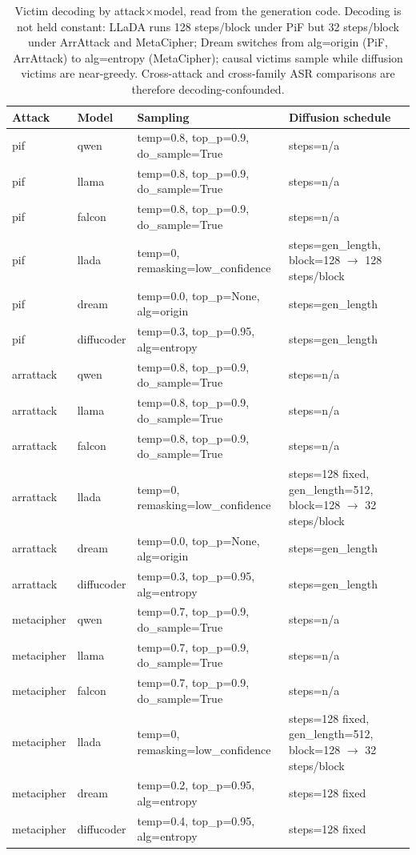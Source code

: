 \begin{table}[t]
\centering
\small
\begin{tabular}{llll}
\toprule
Attack & Model & Sampling & Diffusion schedule \\
\midrule
pif & qwen & temp=0.8, top\_p=0.9, do\_sample=True & steps=n/a \\
pif & llama & temp=0.8, top\_p=0.9, do\_sample=True & steps=n/a \\
pif & falcon & temp=0.8, top\_p=0.9, do\_sample=True & steps=n/a \\
pif & llada & temp=0, remasking=low\_confidence & steps=gen\_length, block=128 $\to$ 128 steps/block \\
pif & dream & temp=0.0, top\_p=None, alg=origin & steps=gen\_length \\
pif & diffucoder & temp=0.3, top\_p=0.95, alg=entropy & steps=gen\_length \\
arrattack & qwen & temp=0.8, top\_p=0.9, do\_sample=True & steps=n/a \\
arrattack & llama & temp=0.8, top\_p=0.9, do\_sample=True & steps=n/a \\
arrattack & falcon & temp=0.8, top\_p=0.9, do\_sample=True & steps=n/a \\
arrattack & llada & temp=0, remasking=low\_confidence & steps=128 fixed, gen\_length=512, block=128 $\to$ 32 steps/block \\
arrattack & dream & temp=0.0, top\_p=None, alg=origin & steps=gen\_length \\
arrattack & diffucoder & temp=0.3, top\_p=0.95, alg=entropy & steps=gen\_length \\
metacipher & qwen & temp=0.7, top\_p=0.9, do\_sample=True & steps=n/a \\
metacipher & llama & temp=0.7, top\_p=0.9, do\_sample=True & steps=n/a \\
metacipher & falcon & temp=0.7, top\_p=0.9, do\_sample=True & steps=n/a \\
metacipher & llada & temp=0, remasking=low\_confidence & steps=128 fixed, gen\_length=512, block=128 $\to$ 32 steps/block \\
metacipher & dream & temp=0.2, top\_p=0.95, alg=entropy & steps=128 fixed \\
metacipher & diffucoder & temp=0.4, top\_p=0.95, alg=entropy & steps=128 fixed \\
\bottomrule
\end{tabular}
\caption{Victim decoding by attack$\times$model, read from the generation code. Decoding is not held constant: LLaDA runs 128 steps/block under PiF but 32 steps/block under ArrAttack and MetaCipher; Dream switches from alg=origin (PiF, ArrAttack) to alg=entropy (MetaCipher); causal victims sample while diffusion victims are near-greedy. Cross-attack and cross-family ASR comparisons are therefore decoding-confounded.}
\label{tab:decoding_config}
\end{table}
